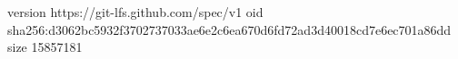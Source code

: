 version https://git-lfs.github.com/spec/v1
oid sha256:d3062bc5932f3702737033ae6e2c6ea670d6fd72ad3d40018cd7e6ec701a86dd
size 15857181
